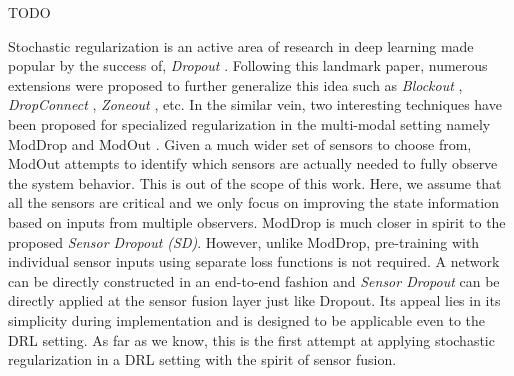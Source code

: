 \documentclass[../thesis.tex]{subfiles}
\begin{document}
TODO








Stochastic regularization is an active area of research in deep learning made popular by the success of, \textit{Dropout} \cite{dropout}. Following this landmark paper, numerous extensions were proposed  to further generalize this idea such as \textit{Blockout} \cite{blockout}, \textit{DropConnect} \cite{dropconnect}, \textit{Zoneout} \cite{zoneout}, etc. In the similar vein, two interesting techniques have been proposed for specialized regularization in the multi-modal setting namely ModDrop \cite{moddrop} and ModOut \cite{modout}. 
Given a much wider set of sensors to choose from, ModOut attempts to identify which sensors are actually needed to fully observe the system behavior. This is out of the scope of this work. Here, we assume that all the sensors are critical and we only focus on improving the state information based on inputs from multiple observers. 
ModDrop is much closer in spirit to the proposed \emph{Sensor Dropout (SD)}. However, unlike ModDrop, pre-training with individual sensor inputs using separate loss functions is not required. A network can be directly constructed in an end-to-end fashion and \emph{Sensor Dropout} can be directly applied at the sensor fusion layer just like Dropout. Its appeal lies in its simplicity during implementation and is designed to be applicable even to the DRL setting. As far as we know, this is the first attempt at applying stochastic regularization in a DRL setting with the spirit of sensor fusion. 
\end{document}

